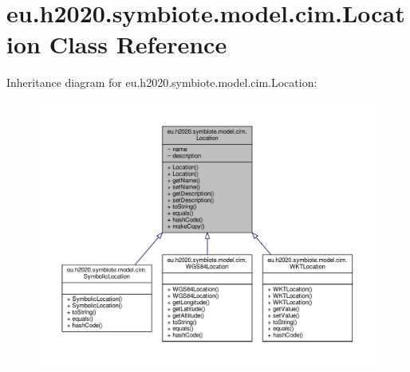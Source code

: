 \hypertarget{classeu_1_1h2020_1_1symbiote_1_1model_1_1cim_1_1Location}{}\section{eu.\+h2020.\+symbiote.\+model.\+cim.\+Location Class Reference}
\label{classeu_1_1h2020_1_1symbiote_1_1model_1_1cim_1_1Location}


Inheritance diagram for eu.\+h2020.\+symbiote.\+model.\+cim.\+Location\+:\nopagebreak
\begin{figure}[H]
\begin{center}
\leavevmode
\includegraphics[width=350pt]{classeu_1_1h2020_1_1symbiote_1_1model_1_1cim_1_1Location__inherit__graph}
\end{center}
\end{figure}


